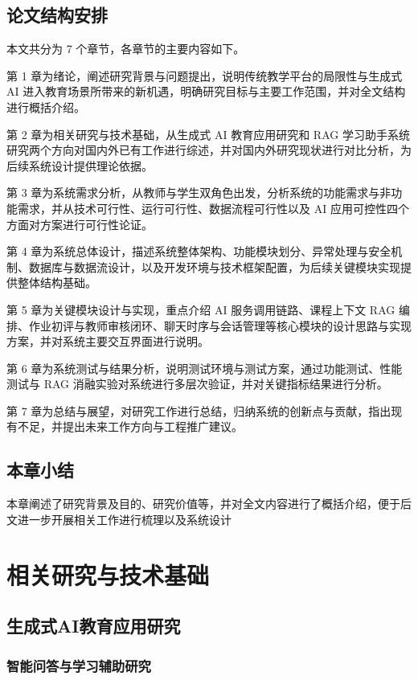\documentclass[12pt,a4paper,oneside]{ctexbook}
\numberwithin{equation}{chapter}
\begin{document}
\section{论文结构安排}
本文共分为 7 个章节，各章节的主要内容如下。

第 1 章为绪论，阐述研究背景与问题提出，说明传统教学平台的局限性与生成式 AI 进入教育场景所带来的新机遇，明确研究目标与主要工作范围，并对全文结构进行概括介绍。

第 2 章为相关研究与技术基础，从生成式 AI 教育应用研究和 RAG 学习助手系统研究两个方向对国内外已有工作进行综述，并对国内外研究现状进行对比分析，为后续系统设计提供理论依据。

第 3 章为系统需求分析，从教师与学生双角色出发，分析系统的功能需求与非功能需求，并从技术可行性、运行可行性、数据流程可行性以及 AI 应用可控性四个方面对方案进行可行性论证。

第 4 章为系统总体设计，描述系统整体架构、功能模块划分、异常处理与安全机制、数据库与数据流设计，以及开发环境与技术框架配置，为后续关键模块实现提供整体结构基础。

第 5 章为关键模块设计与实现，重点介绍 AI 服务调用链路、课程上下文 RAG 编排、作业初评与教师审核闭环、聊天时序与会话管理等核心模块的设计思路与实现方案，并对系统主要交互界面进行说明。

第 6 章为系统测试与结果分析，说明测试环境与测试方案，通过功能测试、性能测试与 RAG 消融实验对系统进行多层次验证，并对关键指标结果进行分析。

第 7 章为总结与展望，对研究工作进行总结，归纳系统的创新点与贡献，指出现有不足，并提出未来工作方向与工程推广建议。

\section{本章小结}
本章阐述了研究背景及目的、研究价值等，并对全文内容进行了概括介绍，便于后文进一步开展相关工作进行梳理以及系统设计

\chapter{相关研究与技术基础}

\section{生成式AI教育应用研究}

\subsection{智能问答与学习辅助研究}
\end{document}
